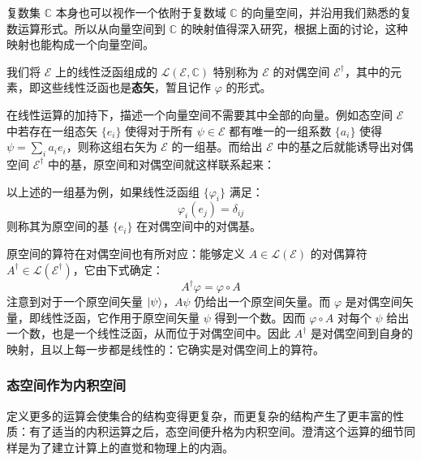\documentclass[cn,10pt,math=newtx,citestyle=gb7714-2015,bibstyle=gb7714-2015]{elegantbook}
\def\ms{\mathscr}
\def\mc{\mathcal}
\def\C{\mathbb C}
\def\vphi{\varphi}
\def\dg{\dagger}
\begin{document}
复数集 $\C$ 本身也可以视作一个依附于复数域 $\C$ 的向量空间，并沿用我们熟悉的复数运算形式。所以从向量空间到 $\C$ 的映射值得深入研究，根据上面的讨论，这种映射也能构成一个向量空间。

\begin{definition}[对偶态空间中的态矢]\label{def:dualspace}
我们将 $\ms E$ 上的线性泛函组成的 $\mc L(\ms E,\C)$ 特别称为 $\ms E$ 的对偶空间 $\ms E^\dg$，其中的元素，即这些线性泛函也是\textbf{态矢}，暂且记作 $\vphi$ 的形式。
\end{definition}

在线性运算的加持下，描述一个向量空间不需要其中全部的向量。例如态空间 $\ms E$ 中若存在一组态矢 $\{e_i\}$ 使得对于所有 $\psi\in\ms E$ 都有唯一的一组系数 $\{a_i\}$ 使得 $\psi=\sum_ia_i e_i $，则称这组右矢为 $\ms E$ 的一组基。而给出 $\ms E$ 中的基之后就能诱导出对偶空间 $\ms E^\dg$ 中的基，原空间和对偶空间就这样联系起来：

\begin{definition}[对偶基]\label{def:dualbasis}
以上述的一组基为例，如果线性泛函组 $\{\vphi_i\}$ 满足：
\begin{equation*}
    \vphi_i(e_j)=\delta_{ij}
\end{equation*}
则称其为原空间的基 $\{e_i\}$ 在对偶空间中的对偶基。
\end{definition}

原空间的算符在对偶空间也有所对应：能够定义 $A\in\mc L(\ms E)$ 的对偶算符 $A^\dg\in\mc L(\ms E^\dg)$，它由下式确定：
\begin{equation}
    A^\dg\vphi=\vphi\circ A
\end{equation}
注意到对于一个原空间矢量 $\ket\psi$，$A\psi$ 仍给出一个原空间矢量。而 $\vphi$ 是对偶空间矢量，即线性泛函，它作用于原空间矢量 $\psi$ 得到一个数。因而 $\vphi\circ A$ 对每个 $\psi$ 给出一个数，也是一个线性泛函，从而位于对偶空间中。因此 $A^\dg$ 是对偶空间到自身的映射，且以上每一步都是线性的：它确实是对偶空间上的算符。

\subsubsection{态空间作为内积空间}

定义更多的运算会使集合的结构变得更复杂，而更复杂的结构产生了更丰富的性质：有了适当的内积运算之后，态空间便升格为内积空间。澄清这个运算的细节同样是为了建立计算上的直觉和物理上的内涵。
\end{document}
